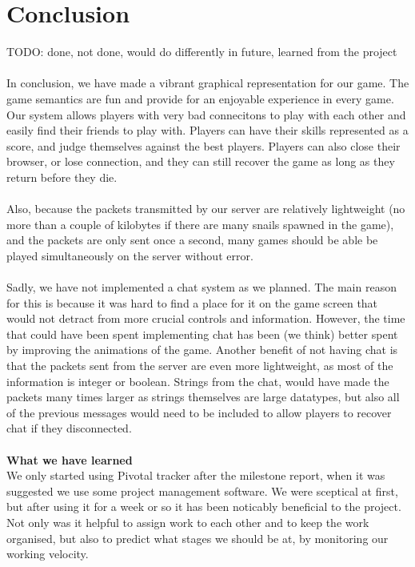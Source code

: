 \documentclass{article}
\begin{document}
\section{Conclusion}
TODO: done, not done, would do differently in future, learned from the project \\ \\
In conclusion, we have made a vibrant graphical representation for our game. The game semantics are fun and provide for an enjoyable experience in every game. Our system allows players with very bad connecitons to play with each other and easily find their friends to play with. Players can have their skills represented as a score, and judge themselves against the best players. Players can also close their browser, or lose connection, and they can still recover the game as long as they return before they die. \\ \\
Also, because the packets transmitted by our server are relatively lightweight (no more than a couple of kilobytes if there are many snails spawned in the game), and the packets are only sent once a second, many games should be able be played simultaneously on the server without error. \\ \\
Sadly, we have not implemented a chat system as we planned. The main reason for this is because it was hard to find a place for it on the game screen that would not detract from more crucial controls and information. However, the time that  could have been spent implementing chat has been (we think) better spent by improving the animations of the game. Another benefit of not having chat is that the packets sent from the server are even more lightweight, as most of the information is integer or boolean. Strings from the chat, would have made the packets many times larger as strings themselves are large datatypes, but also all of the previous messages would need to be included to allow players to recover chat if they disconnected. \\ \\
\textbf{What we have learned} \\
We only started using Pivotal tracker after the milestone report, when it was suggested we use some project management software. We were sceptical at first, but after using it for a week or so it has been noticably beneficial to the project. Not only was it helpful to assign work to each other and to keep the work organised, but also to predict what stages we should be at, by monitoring our working velocity. \\ \\
\end{document}
